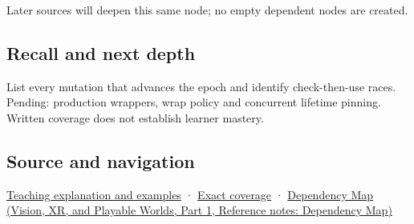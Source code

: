 Later sources will deepen this same node; no empty dependent nodes are created.

\subsection{Recall and next depth}\label{appendix-aa405b7c3903-recall-and-next-depth}

\hypertarget{appendix-aa405b7c3903-recall-and-next-depth}{}

List every mutation that advances the epoch and identify check-then-use races. Pending: production wrappers, wrap policy and concurrent lifetime pinning. Written coverage does not establish learner mastery.

\subsection{Source and navigation}\label{appendix-aa405b7c3903-source-and-navigation}

\hypertarget{appendix-aa405b7c3903-source-and-navigation}{}

\hyperref[01-foundations-i-ch003-when-a-valid-borrow-stops-naming-the-intended-thing]{Teaching explanation and examples} · \hyperref[appendix-fd090d982a15-m008---parts-113-126]{Exact coverage} · \href{../07-Vision-XR-and-Playable-Worlds-P01/main.pdf\#appendix-4ad47bdd269a}{Dependency Map (Vision, XR, and Playable Worlds, Part 1, Reference notes: Dependency Map)}
